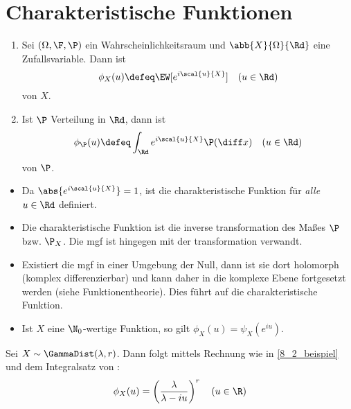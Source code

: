 \section{Charakteristische Funktionen}

\begin{definition}
	\label{8_8_definition}
	\begin{enumerate}[leftmargin=*,nolistsep]
		\item Sei $(\Omega,\F,\P)$ ein Wahrscheinlichkeitsraum und $\abb{X}{\Omega}{\Rd}$ eine Zufallsvariable. Dann ist
		\begin{equation*}
			\phi_X(u) \defeq \EW[e^{i \scal{u}{X}}] \quad (u \in \Rd)
		\end{equation*}
		 von $X$.
		\item Ist $\P$ Verteilung in $\Rd$, dann ist
		\begin{equation*}
			\phi_{\P}(u) \defeq \int_{\Rd} e^{i \scal{u}{X}} \P(\diff x) \quad (u \in \Rd)
		\end{equation*}
		 von $\P$.
	\end{enumerate}
\end{definition}

\begin{*bemerkung}
	\begin{itemize}[leftmargin=*,nolistsep]
		\item Da $\abs{e^{i \scal{u}{X}}} = 1$, ist die charakteristische Funktion für \textit{alle} $u \in \Rd$ definiert.
		\item Die charakteristische Funktion ist die inverse transformation des Maßes $\P$ bzw. $\P_X$. Die mgf ist hingegen mit der transformation verwandt.
		\item Existiert die mgf in einer Umgebung der Null, dann ist sie dort holomorph (komplex differenzierbar) und kann daher in die komplexe Ebene fortgesetzt werden (siehe Funktionentheorie). Dies führt auf die charakteristische Funktion.
		\item Ist $X$ eine $\N_0$-wertige Funktion, so gilt $\phi_X(u) = \psi_X(e^{i u})$.
	\end{itemize}
\end{*bemerkung}

\begin{beispiel}
	\label{8_9_beispiel}
	Sei $X \sim \GammaDist(\lambda,r)$. Dann folgt mittels Rechnung wie in \cref{8_2_beispiel} und dem Integralsatz von :
	\begin{equation*}
		\phi_X(u) = \left( \frac{\lambda}{\lambda-i u} \right)^r \quad (u \in \R)
	\end{equation*}
\end{beispiel}

